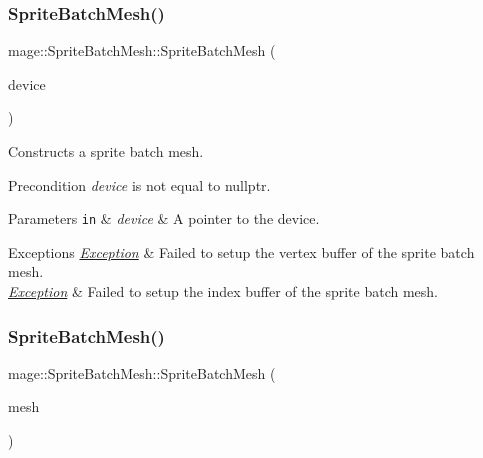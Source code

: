 \subsubsection{\texorpdfstring{Sprite\+Batch\+Mesh()}{SpriteBatchMesh()}\hspace{0.1cm}{\footnotesize\ttfamily [2/4]}}
{\footnotesize\ttfamily mage\+::\+Sprite\+Batch\+Mesh\+::\+Sprite\+Batch\+Mesh (\begin{DoxyParamCaption}\item[{I\+D3\+D11\+Device5 $\ast$}]{device }\end{DoxyParamCaption})\hspace{0.3cm}{\ttfamily [explicit]}}

Constructs a sprite batch mesh.

\begin{DoxyPrecond}{Precondition}
{\itshape device} is not equal to {\ttfamily nullptr}. 
\end{DoxyPrecond}

\begin{DoxyParams}[1]{Parameters}
\mbox{\tt in}  & {\em device} & A pointer to the device. \\
\hline
\end{DoxyParams}

\begin{DoxyExceptions}{Exceptions}
{\em \hyperlink{classmage_1_1_exception}{Exception}} & Failed to setup the vertex buffer of the sprite batch mesh. \\
\hline
{\em \hyperlink{classmage_1_1_exception}{Exception}} & Failed to setup the index buffer of the sprite batch mesh. \\
\hline
\end{DoxyExceptions}
\hypertarget{classmage_1_1_sprite_batch_mesh_a06615b441ee7cc03d4a50e2f29c4be46}{}\label{classmage_1_1_sprite_batch_mesh_a06615b441ee7cc03d4a50e2f29c4be46} 
\subsubsection{\texorpdfstring{Sprite\+Batch\+Mesh()}{SpriteBatchMesh()}\hspace{0.1cm}{\footnotesize\ttfamily [3/4]}}
{\footnotesize\ttfamily mage\+::\+Sprite\+Batch\+Mesh\+::\+Sprite\+Batch\+Mesh (\begin{DoxyParamCaption}\item[{const \hyperlink{classmage_1_1_sprite_batch_mesh}{Sprite\+Batch\+Mesh} \&}]{mesh }\end{DoxyParamCaption})\hspace{0.3cm}{\ttfamily [delete]}}

